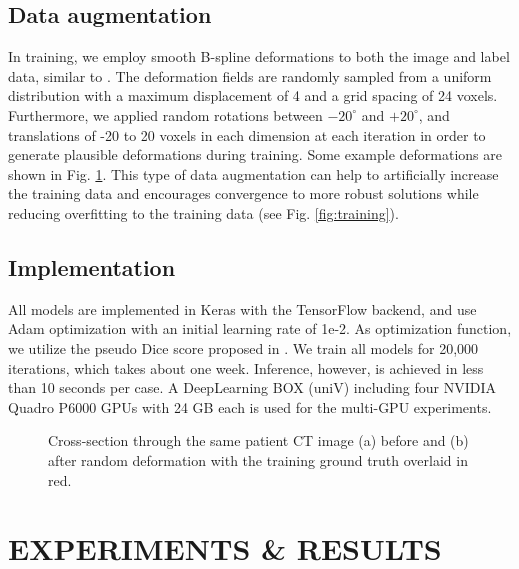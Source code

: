 \documentclass[a4paper]{spie}  %
\begin{document}
\subsection{Data augmentation} In training, we employ smooth B-spline deformations to both the image and label data, similar to \cite{cciccek20163d}. The deformation fields are randomly sampled from a uniform distribution with a maximum displacement of 4 and a grid spacing of 24 voxels. Furthermore, we applied random rotations between $-20^{\circ}$ and $+20^{\circ}$, and translations of -20 to 20 voxels in each dimension at each iteration in order to generate plausible deformations during training. Some example deformations are shown in Fig. \ref{fig:deform}. This type of data augmentation can help to artificially increase the training data and encourages convergence to more robust solutions while reducing overfitting to the training data (see Fig. \ref{fig:training}).

\subsection{Implementation} All models are implemented in Keras with the TensorFlow backend, and use Adam optimization \cite{kingma2014adam} with an initial learning rate of 1e-2. As optimization function, we utilize the pseudo Dice score proposed in \cite{milletari2016v}. We train all models for 20,000 iterations, which takes about one week. Inference, however, is achieved in less than 10 seconds per case. A DeepLearning BOX (uniV) including four NVIDIA Quadro P6000 GPUs with 24 GB each is used for the multi-GPU experiments.

\begin{figure}[htb]
  \centering
	\hspace{2em}
    \vspace{1em}
\caption{ Cross-section through the same patient CT image (a) before and (b) after random deformation with the training ground truth overlaid in red. \label{fig:deform}}
\end{figure}
\section{EXPERIMENTS \& RESULTS}
\end{document}
